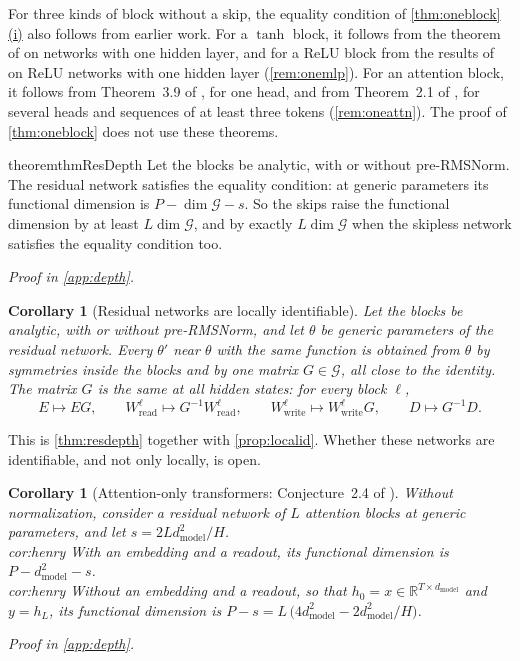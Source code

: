\documentclass[10pt]{article}
\newtheorem{corollary}[theorem]{Corollary}
\theoremstyle{definition}
\theoremstyle{remark}
\newcommand{\R}{\mathbb{R}}
\newcommand{\Wread}{W_{\mathrm{read}}}
\newcommand{\Wwrite}{W_{\mathrm{write}}}
\newcommand{\dm}{d_{\mathrm{model}}}
\newcommand{\G}{\mathcal{G}}
\newcommand{\ptlabel}[1]{\phantomsection\label{#1}}
\DeclareRobustCommand{\cpref}[2]{\hyperref[#1:#2]{\cref*{#1}(#2)}}
\newcommand{\proofin}[1]{\par\vspace{-0.4\baselineskip}\noindent\hfill{\small\itshape Proof in \cref{#1}.}\par\smallskip}
\newcommand{\stpart}[3]{\ifx\relax#1\relax\else\ptlabel{#1:#2}\fi{\upshape\bfseries\boldmath(#2)\ifx\relax#3\relax\else\ #3.\fi}}
\begin{document}
For three kinds of block without a skip, the equality condition of \cpref{thm:oneblock}{i} also follows from earlier work. For a $\tanh$ block, it follows from the theorem of \citet{sussmann1992} on networks with one hidden layer, and for a ReLU block from the results of \citet{stock2021embedding} on ReLU networks with one hidden layer (\cref{rem:onemlp}). For an attention block, it follows from Theorem~3.9 of \citet{henry2025lightning}, for one head, and from Theorem~2.1 of \citet{henry2026generic}, for several heads and sequences of at least three tokens (\cref{rem:oneattn}). The proof of \cref{thm:oneblock} does not use these theorems.

\begin{restatable}{theorem}{thmResDepth}\label{thm:resdepth}
Let the blocks be analytic, with or without pre-RMSNorm. The residual network satisfies the equality condition: at generic parameters its functional dimension is $P - \dim\G - s$. So the skips raise the functional dimension by at least $L\dim\G$, and by exactly $L\dim\G$ when the skipless network satisfies the equality condition too.
\end{restatable}
\proofin{app:depth}

\begin{corollary}[Residual networks are locally identifiable]\label{cor:localid}
Let the blocks be analytic, with or without pre-RMSNorm, and let $\theta$ be generic parameters of the residual network. Every $\theta'$ near $\theta$ with the same function is obtained from $\theta$ by symmetries inside the blocks and by one matrix $G \in \G$, all close to the identity. The matrix $G$ is the same at all hidden states: for every block $\ell$,
\[
E \mapsto EG, \qquad \Wread^{\ell} \mapsto G^{-1}\Wread^{\ell}, \qquad \Wwrite^{\ell} \mapsto \Wwrite^{\ell}G, \qquad D \mapsto G^{-1}D.
\]
\end{corollary}

This is \cref{thm:resdepth} together with \cref{prop:localid}. Whether these networks are identifiable, and not only locally, is open.

\begin{corollary}[Attention-only transformers: Conjecture~2.4 of \citealp{henry2026generic}]\label{cor:henry}
Without normalization, consider a residual network of $L$ attention blocks at generic parameters, and let $s = 2L\dm^2/H$.\\
\stpart{cor:henry}{i}{} With an embedding and a readout, its functional dimension is $P - \dm^2 - s$.\\
\stpart{cor:henry}{ii}{} Without an embedding and a readout, so that $h_0 = x \in \R^{T\times\dm}$ and $y = h_L$, its functional dimension is $P - s = L\,\big(4\dm^2 - 2\dm^2/H\big)$.
\end{corollary}
\proofin{app:depth}
\end{document}
